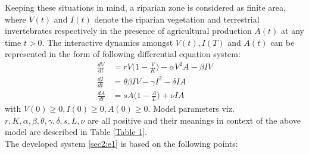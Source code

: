 \documentclass[12pt]{article}
\numberwithin{equation}{section}
\begin{document}
Keeping these situations in mind, a riparian zone is considered as finite area, where $V(t)$ and $I(t)$ denote the riparian vegetation and terrestrial invertebrates respectively in the presence of agricultural production $A(t)$ at any time $t>0$. The interactive dynamics amongst $V(t), I(T)$ and $A(t)$ can be represented in the form of following differential equation system:
\begin{subequations}\label{sec2:e1}
	\begin{align}
	\label{sec2:e1a} \frac{dV}{dt}&=rV\bigg(1-\frac{V}{K}\bigg)-\alpha V^2A -\beta IV\\
	\label{sec2:e1b} \frac{dI}{dt}&=\theta \beta IV -\gamma I^2 - \delta IA\\
	\label{sec2:e1c} \frac{dA}{dt}&= sA\bigg(1-\frac{A}{L}\bigg)+\nu IA
	\end{align}
\end{subequations}
with $V(0) \geq 0, I(0)\geq 0, A(0)\geq 0$. Model parameters viz. $r, K, \alpha, \beta, \theta, \gamma, \delta, s, L, \nu$ are all positive and their meanings in context of the above model are described in Table \ref{Table 1}.  \\
The developed system \eqref{sec2:e1} is based on the following points:
\end{document}
